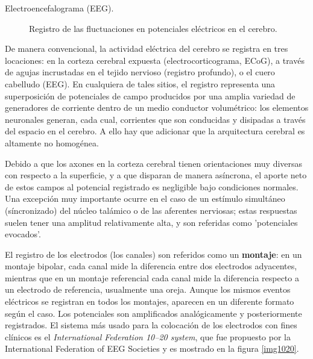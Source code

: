 \documentclass[12pt,a4paper]{mitthesis}
\begin{document}
\begin{description}
\item[Electroencefalograma (EEG).] Registro de las fluctuaciones en potenciales el\'ectricos en el 
cerebro.
\end{description}

De manera convencional, la actividad el\'ectrica del cerebro se registra en tres locaciones: en la 
corteza cerebral expuesta (electrocorticograma, ECoG), a trav\'es de agujas incrustadas en el 
tejido nervioso (registro profundo), o el cuero cabelludo (EEG).
En cualquiera de tales sitios, el registro representa una superposici\'on de potenciales de campo 
producidos por una amplia variedad de generadores de corriente dentro de un medio conductor 
volum\'etrico: los elementos neuronales generan, cada cual, corrientes que son conducidas y 
disipadas a trav\'es del espacio en el cerebro.
A ello hay que adicionar que la arquitectura cerebral es altamente no homog\'enea.

Debido a que los axones en la corteza cerebral tienen orientaciones muy diversas con respecto a la 
superficie, y a que disparan de manera as\'incrona, el aporte neto de estos campos al potencial 
registrado es negligible bajo condiciones normales.
Una excepci\'on muy importante ocurre en el caso de un est\'imulo simult\'aneo (s\'incronizado)
del n\'ucleo tal\'amico o de las aferentes nerviosas; estas respuestas suelen tener 
una amplitud relativamente alta, y son referidas como 'potenciales evocados'.

El registro de los electrodos (los canales) son referidos como un \textbf{montaje}: en un montaje 
bipolar, cada canal mide la diferencia entre dos electrodos adyacentes, mientras que en un montaje 
referencial cada canal mide la diferencia respecto a un electrodo de referencia, usualmente una 
oreja.
Aunque los mismos eventos el\'ectricos se registran en todos los montajes, aparecen en un diferente 
formato seg\'un el caso. 
Los potenciales son amplificados anal\'ogicamente y posteriormente registrados.
El sistema m\'as usado para la colocaci\'on de los electrodos con fines cl\'inicos es el 
\textit{International Federation 10--20 system}, que fue propuesto por la International Federation 
of EEG Societies \cite{Jasper58,AASM07} y es mostrado en la figura \ref{img1020}. 
\end{document}
